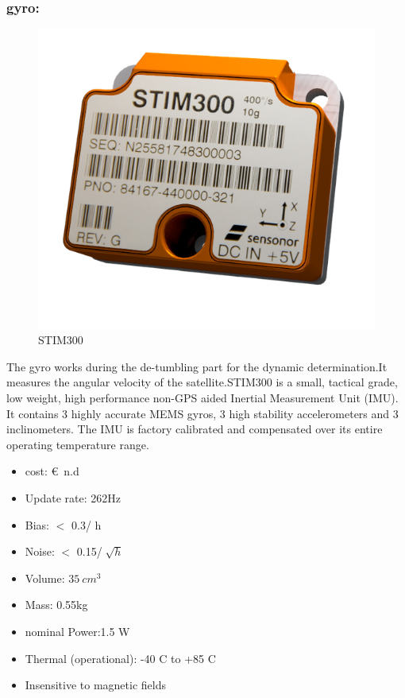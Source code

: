 \documentclass[11pt]{article}
\begin{document}
\subsubsection{gyro:}
\begin{minipage}{.4\textwidth}
\begin{figure} [H]

\centering 

\includegraphics[scale=0.34]{Gyro.PNG}
\caption{ STIM300
\cite{gyro}}
\label{gyro}
\end{figure}
\end{minipage}
\begin{minipage}{.6 \textwidth}
The gyro works during the de-tumbling part for the dynamic determination.It measures the angular velocity of the satellite.STIM300 is a small, tactical grade, low weight, high performance non-GPS aided Inertial Measurement Unit (IMU). It contains 3 highly accurate MEMS gyros, 3 high stability accelerometers and 3 inclinometers. The IMU is factory calibrated and compensated over its entire operating temperature range.
\end{minipage}

  \begin{multicols}{2}
\begin{itemize}
\item cost: \euro{\ n.d}
\item   Update rate:  262Hz
\item   Bias: $<$ 0.3\degree/ h\
\item  Noise: $ <$ 0.15\degree/$\sqrt[]{h}$
\item  Volume: $35 \ cm^3$
\item  Mass:  0.55kg
\item    nominal Power:1.5 W
\item    Thermal (operational): -40 \degree C to +85 \degree C
\item Insensitive to magnetic fields   


\end{itemize}
\end{multicols}
\end{document}
